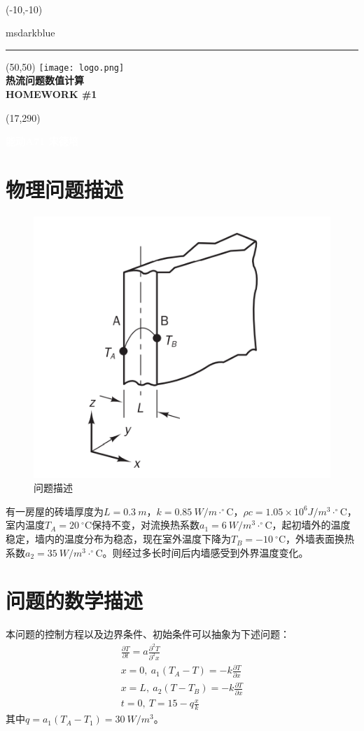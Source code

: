 \documentclass[10pt]{scrartcl}
\begin{document}
\setlength{\TPHorizModule}{1mm}
\setlength{\TPVertModule}{1mm}
\begin{titlepage}
~
\begin{textblock}{50}(-10,-10)
\begin{color}{msdarkblue}
\rule{4cm}{32cm}
\end{color}
\end{textblock}
\begin{textblock}{80}(50,50)
\texttt{[image: logo.png]}\\[6pt]
{\noindent\Huge\bfseries 热流问题数值计算 }\\
{\noindent\Large\bfseries HOMEWORK \#1}
\end{textblock}
\begin{textblock}{20}(17,290)
\begin{rotate}{90}
{\huge\bfseries \textcolor{white}{能动A71 宋德培}}
\end{rotate}
\end{textblock}
\end{titlepage}
\tableofcontents
\clearpage
\section{物理问题描述}
\begin{figure}[H]
	\centering
	\includegraphics[width=0.4\linewidth]{1}
	\caption{问题描述}
	\label{fig:1}
\end{figure}

有一房屋的砖墙厚度为$L = 0.3\ m$，$k=0.85\ W/m\cdot^{\circ}$C，$\rho c=1.05\times 10^6 J/m^3\cdot^{\circ}$C，室内温度$T_{A}=20\ ^{\circ}$C保持不变，对流换热系数$a_1 = 6\ W/m^3\cdot ^{\circ}$C，起初墙外的温度稳定，墙内的温度分布为稳态，现在室外温度下降为$T_{B}=-10\ ^{\circ}$C，外墙表面换热系数$a_2=35\ W/m^3\cdot^{\circ}$C。则经过多长时间后内墙感受到外界温度变化。
\section{问题的数学描述}
本问题的控制方程以及边界条件、初始条件可以抽象为下述问题：
\begin{align}
	\frac{\partial T}{\partial t} = a\frac{\partial^2 T}{\partial^2 x}\\
	x=0,\ a_1(T_{A}-T) = -k\frac{\partial T}{\partial x}\\
	x=L,\ a_2(T-T_{B}) = -k\frac{\partial T}{\partial x}\\
	t=0,\ T=15-q\frac{x}{k}
\end{align}
其中$q = a_1(T_{A}-T_1)=30\ W/m^3$。
\end{document}
